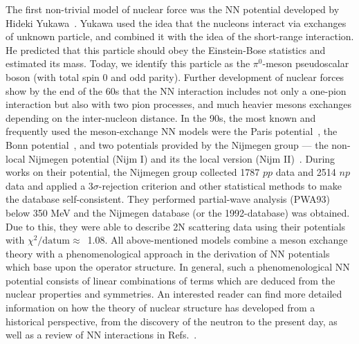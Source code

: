 The first non-trivial model of nuclear force was the NN potential developed by Hideki Yukawa~\cite{yukawa1935interaction}. Yukawa used the idea that the nucleons interact via exchanges of unknown particle, and combined it with the idea of the short-range interaction. He predicted that this particle should obey the Einstein-Bose statistics and estimated its mass. Today, we identify this particle as the $\pi^{0}$-meson pseudoscalar boson (with total spin 0 and odd parity). Further development of nuclear forces show by the end of the 60s that the NN interaction includes not only a one-pion interaction but also with two pion processes, and much heavier mesons exchanges depending on the inter-nucleon distance. In the 90s, the most known and frequently used the meson-exchange NN models were the Paris potential~\cite{cottingham1973nucleon}, the Bonn potential~\cite{machleidt1987bonn}, and two potentials provided by the Nijmegen group --- the non-local Nijmegen potential (Nijm I) and its the local version (Nijm II)~\cite{stoks1993partial}. During works on their potential, the Nijmegen group collected 1787 $pp$ data and 2514 $np$ data and applied a 3$\sigma$-rejection criterion and other statistical methods to make the database self-consistent. They performed partial-wave analysis (PWA93) below 350 MeV and the Nijmegen database (or the 1992-database) was obtained. Due to this, they were able to describe 2N scattering data using their potentials with $\chi^{2}/\textrm{datum}\approx$~1.08.
All above-mentioned models combine a meson exchange theory with a phenomenological approach in the derivation of NN potentials which base upon the operator structure. In general, such a phenomenological NN potential consists of linear combinations of terms which are deduced from the nuclear properties and symmetries. An interested reader can find more detailed information on how the theory of nuclear structure has developed from a historical perspective, from the discovery of the neutron to the present day, as well as a review of NN interactions in Refs.~\cite{Machleidt2014, naghdi2014nucleon, zhaba2017deuteron, machleidt2017historical, Soma2018}.
